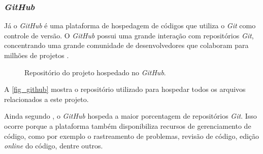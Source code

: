 \subsubsection{\textit{GitHub}}


Já o \textit{GitHub} é uma plataforma de hospedagem de códigos que utiliza o \textit{Git} como controle de versão. O \textit{GitHub} possui uma grande interação com repositórios \textit{Git}, concentrando uma grande comunidade de desenvolvedores que colaboram para milhões de projetos \cite{CHACON2014}.

\begin{figure}[h]
	\caption{\label{fig_github}Repositório do projeto hospedado no \textit{GitHub}.}
	\begin{center}
	\end{center}
	\centering {}
\end{figure}

A \autoref{fig_github} mostra o repositório utilizado para hospedar todos os arquivos relacionados a este projeto.

Ainda segundo , o \textit{GitHub} hospeda a maior porcentagem de repositórios \textit{Git}. Isso ocorre porque a plataforma também disponibiliza recursos de gerenciamento de código, como por exemplo o rastreamento de problemas, revisão de código, edição \textit{online} do código, dentre outros.